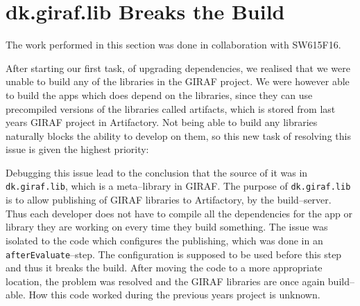\section{dk.giraf.lib Breaks the Build}\label{sec:breaking}
The work performed in this section was done in collaboration with SW615F16.

After starting our first task, of upgrading dependencies, we realised that we were unable to build any of the libraries in the GIRAF project.
We were however able to build the apps which does depend on the libraries, since they can use precompiled versions of the libraries called artifacts, which is stored from last years GIRAF project in Artifactory.
Not being able to build any libraries naturally blocks the ability to develop on them, so this new task of resolving this issue is given the highest priority: \pblocking

Debugging this issue lead to the conclusion that the source of it was in \texttt{dk.giraf.lib}, which is a meta--library in GIRAF.
The purpose of \texttt{dk.giraf.lib} is to allow publishing of GIRAF libraries to Artifactory, by the build--server.
Thus each developer does not have to compile all the dependencies for the app or library they are working on every time they build something.
The issue was isolated to the code which configures the publishing, which was done in an \texttt{afterEvaluate}--step.
The configuration is supposed to be used before this step and thus it breaks the build.
After moving the code to a more appropriate location, the problem was resolved and the GIRAF libraries are once again build--able.
How this code worked during the previous years project is unknown.
